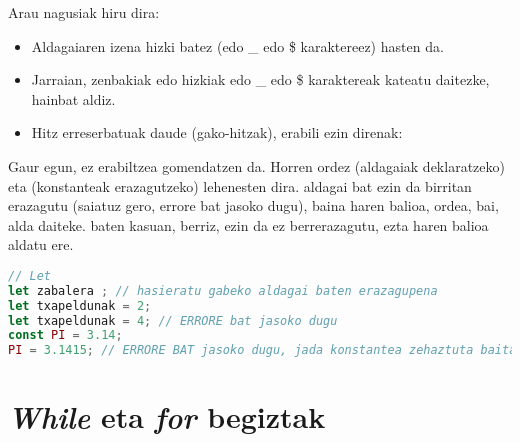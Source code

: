 Arau nagusiak hiru dira:
\begin{itemize}
\item Aldagaiaren izena hizki batez (edo \_ edo \$ karaktereez) hasten da.
\item Jarraian, zenbakiak edo hizkiak edo \_ edo \$ karaktereak kateatu daitezke, hainbat aldiz.

\item Hitz erreserbatuak daude (gako-hitzak), erabili ezin direnak:

\end{itemize} 

Gaur egun, \textit{} ez erabiltzea gomendatzen da. Horren ordez \textit{} (aldagaiak deklaratzeko) eta \textit{} (konstanteak erazagutzeko) lehenesten dira. \textit{} aldagai bat ezin da birritan erazagutu (saiatuz gero, errore bat jasoko dugu), baina haren balioa, ordea, bai, alda daiteke. \textit{} baten kasuan, berriz, ezin da ez berrerazagutu, ezta haren balioa aldatu ere. 

\begin{minipage}{\linewidth}
\begin{lstlisting}[language=JavaScript]
// Let
let zabalera ; // hasieratu gabeko aldagai baten erazagupena
let txapeldunak = 2;
let txapeldunak = 4; // ERRORE bat jasoko dugu
const PI = 3.14;
PI = 3.1415; // ERRORE BAT jasoko dugu, jada konstantea zehaztuta baitago

\end{lstlisting}
\end{minipage}



\section{\textit{While} eta \textit{for} begiztak}

